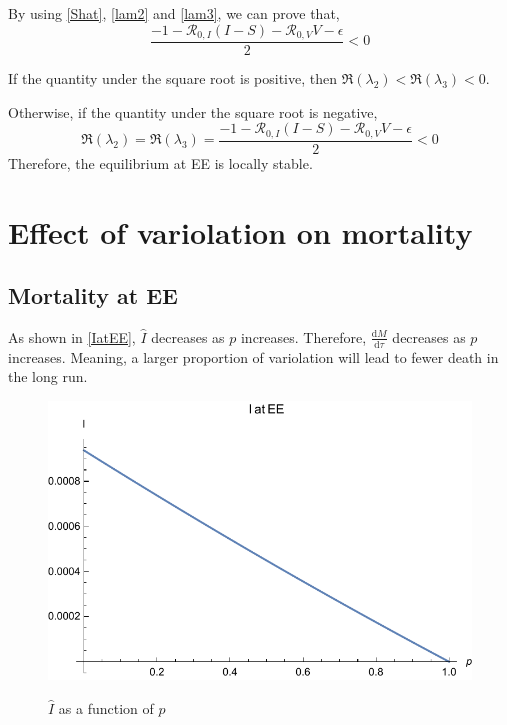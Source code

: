 \documentclass[12pt]{article}
\newcommand\dbyd[2]{\frac{\mathrm d{#1}}{\mathrm d{#2}}}
\newcommand{\R}{\mathcal{R}}
\begin{document}
By using \autoref{Shat}, \autoref{lam2} and \autoref{lam3}, we can prove that,
\begin{equation}
\frac{-1-\R_{0,I}(I-S)-\R_{0,V}V-\epsilon}{2}<0
\end{equation}

If the quantity under the square root is positive, then $\Re(\lambda_2)<\Re(\lambda_3)<0$.

Otherwise, if the quantity under the square root is negative,
\begin{equation}
\Re(\lambda_2)=\Re(\lambda_3)=\frac{-1-\R_{0,I}(I-S)-\R_{0,V}V-\epsilon}{2}<0
\end{equation}
Therefore, the equilibrium at EE is locally stable.
\clearpage
\section{Effect of variolation on mortality}
\subsection{Mortality at EE}
As shown in \autoref{IatEE}, $\hat{I}$ decreases as $p$ increases. Therefore, $\dbyd{M}{\tau}$ decreases as $p$ increases. Meaning, a larger proportion of variolation will lead to fewer death in the long run.
\begin{figure}[H]
  \caption{$\hat{I}$ as a function of $p$}
  \centering\label{IatEE}
  \includegraphics[width=1\textwidth]{Figures/I_at_EE.pdf}
\end{figure}
\end{document}
